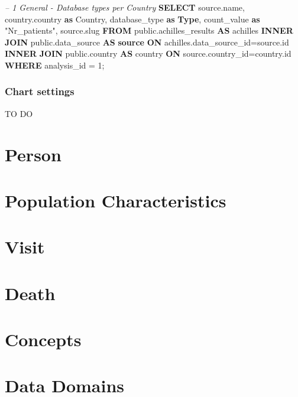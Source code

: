 \documentclass[]{book}
\newenvironment{Shaded}{\begin{snugshade}}{\end{snugshade}}
\newcommand{\KeywordTok}[1]{\textcolor[rgb]{0.13,0.29,0.53}{\textbf{#1}}}
\newcommand{\DecValTok}[1]{\textcolor[rgb]{0.00,0.00,0.81}{#1}}
\newcommand{\CommentTok}[1]{\textcolor[rgb]{0.56,0.35,0.01}{\textit{#1}}}
\newcommand{\OtherTok}[1]{\textcolor[rgb]{0.56,0.35,0.01}{#1}}
\newcommand{\NormalTok}[1]{#1}
\begin{document}
\begin{Shaded}
\begin{Highlighting}[]
\CommentTok{-- 1    General - Database types per Country}
\KeywordTok{SELECT}\NormalTok{ source.name, }
\NormalTok{       country.country }\KeywordTok{as}\NormalTok{ Country, }
\NormalTok{       database_type }\KeywordTok{as} \KeywordTok{Type}\NormalTok{,}
\NormalTok{       count_value }\KeywordTok{as} \OtherTok{"Nr_patients"}\NormalTok{,}
\NormalTok{       source.slug}
\KeywordTok{FROM}\NormalTok{ public.achilles_results }\KeywordTok{AS}\NormalTok{ achilles }\KeywordTok{INNER} \KeywordTok{JOIN} 
\NormalTok{  public.data_source }\KeywordTok{AS} \KeywordTok{source} \KeywordTok{ON}\NormalTok{ achilles.data_source_id=source.id}
  \KeywordTok{INNER} \KeywordTok{JOIN}\NormalTok{ public.country }\KeywordTok{AS}\NormalTok{ country }\KeywordTok{ON} 
\NormalTok{  source.country_id=country.id}
\KeywordTok{WHERE}\NormalTok{ analysis_id = }\DecValTok{1}\NormalTok{;}
\end{Highlighting}
\end{Shaded}

\subsection{Chart settings}\label{chart-settings-6}

TO DO

\chapter{Person}\label{person}

\chapter{Population Characteristics}\label{population-characteristics}

\chapter{Visit}\label{visit}

\chapter{Death}\label{death}

\chapter{Concepts}\label{concepts}

\chapter{Data Domains}\label{data-domains}


\end{document}
